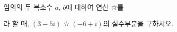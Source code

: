 임의의 두 복소수 $a$, $b$에 대하여 연산 $\mathbin{\text{☆}}$를\par\smallskip{}\par\smallskip\noindent 라 할 때, $(3-5i)\mathbin{\text{☆}}(-6+i)$의 실수부분을 구하시오.
